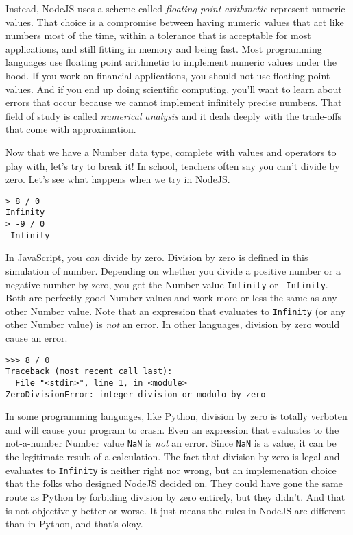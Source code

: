 Instead, NodeJS uses a scheme called \textit{floating point arithmetic}
represent numeric values.  That choice is a
compromise between having numeric values that act like numbers most of the time,
within a tolerance that is acceptable for most applications, and still fitting
in memory and being fast. Most programming languages use floating point
arithmetic to implement numeric values under the hood. If you work on financial
applications, you should not use floating point values. And if you end up doing
scientific computing, you'll want to learn about errors that occur because we
cannot implement infinitely precise numbers. That field of study is called
\emph{numerical analysis} and it deals deeply with the trade-offs that come with
approximation.

Now that we have a \textsf{Number} data type, complete with values and operators
to play with, let's try to break it! In school, teachers often say you can't
divide by zero. Let's see what happens when we try in NodeJS.

\begin{lstlisting}
> 8 / 0
Infinity
> -9 / 0
-Infinity
\end{lstlisting}

In JavaScript, you \emph{can} divide by zero. Division by zero is defined in
this simulation of number. Depending on whether you divide a positive number or
a negative number by zero, you get the \textsf{Number} value \texttt{Infinity}
or \texttt{-Infinity}. Both are perfectly good \textsf{Number} values and work
more-or-less the same as any other \textsf{Number} value. Note that an
expression that evaluates to \texttt{Infinity} (or any other \textsf{Number}
value) is \emph{not} an error. In other languages, division by zero would cause
an error.

\begin{lstlisting}[caption={Try this at home, kids! A stack trace caused by a
\texttt{ZeroDivisionError} in a Python interpreter.}]
>>> 8 / 0
Traceback (most recent call last):
  File "<stdin>", line 1, in <module>
ZeroDivisionError: integer division or modulo by zero
\end{lstlisting}

In some programming languages, like Python, division by zero is totally verboten
and will cause your program to crash. Even an expression that evaluates to the
not-a-number \textsf{Number} value \texttt{NaN} is \emph{not} an error. Since
\texttt{NaN} is a value, it can be the legitimate result of a calculation. The
fact that division by zero is legal and evaluates to \texttt{Infinity} is
neither right nor wrong, but an implemenation choice that the folks who designed
NodeJS decided on. They could have gone the same route as Python by forbiding
division by zero entirely, but they didn't. And that is not objectively better
or worse. It just means the rules in NodeJS are different than in Python, and
that's okay.

